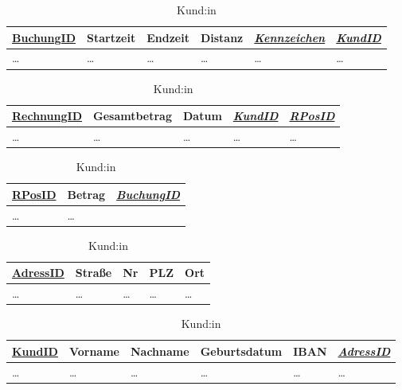 \begin{table}
	\centering
	\caption{Buchung}\label{table:Buchung_main}
	\begin{tabular}{l l l l l l} \toprule
		\underline{BuchungID} & Startzeit & Endzeit & Distanz & \textit{\underline{Kennzeichen}} & \textit{\underline{KundID} 	} \\ 
		\midrule
		\dots &  \dots & \dots  & \dots & \dots & \dots \\
		\bottomrule
	\end{tabular}

	\centering
	\caption{Rechnung}\label{table:Rechnung_main}
	\begin{tabular}{l l l l l} \toprule
		\underline{RechnungID}  & Gesamtbetrag & Datum & \textit{\underline{KundID}} &  \textit{\underline{RPosID}}  \\ 
		\midrule
		\dots &  \dots & \dots  & \dots & \dots  \\
		\bottomrule
	\end{tabular}

	\parbox{.49\linewidth}{
		\centering
		\caption{Rechnungsposition}\label{table:Rechnungsposition_main}
		\begin{tabular}{l l l} \toprule
			\underline{RPosID} & Betrag & \textit{\underline{BuchungID}} \\ 
			\midrule
			\dots &  \dots \\
			\bottomrule
		\end{tabular}
	}
	\parbox{.49\linewidth}{
		\centering
		\caption{Adresse}\label{table:Adresse_main}
		\begin{tabular}{l l l l l} \toprule
			\underline{AdressID} & Stra\ss e & Nr & PLZ & Ort \\ 
			\midrule
			\dots &  \dots & \dots  & \dots & \dots \\
			\bottomrule
		\end{tabular}
	}

	\centering
	\caption{Kund:in}\label{table:Kund_main}
	\begin{tabular}{l l l l l l} \toprule
	\underline{KundID} 	& Vorname & Nachname & Geburtsdatum & IBAN & \textit{\underline{AdressID}} \\ 
	\midrule
	\dots &  \dots & \dots  & \dots & \dots & \dots \\
	\bottomrule
	\end{tabular}


\end{table}

